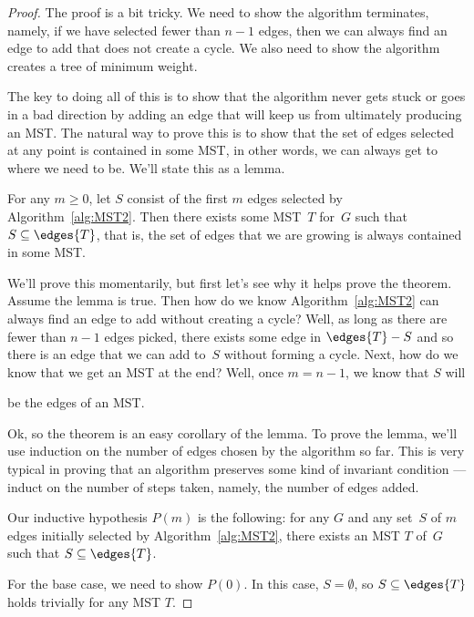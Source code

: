 \begin{proof}
The proof is a bit tricky.  We need to show the algorithm terminates,
namely, if we have selected fewer than $n - 1$ edges, then we can
always find an edge to add that does not create a cycle.  We also need
to show the algorithm creates a tree of minimum weight.

The key to doing all of this is to show that the algorithm never gets
stuck or goes in a bad direction by adding an edge that will keep us
from ultimately producing an MST\@.  The natural way to prove this is
to show that the set of edges selected at any point is contained in
some MST, in other words, we can always get to where we need to be.
We'll state this as a lemma.

\begin{lemma}\label{lemma:MST2}
  For any $m \ge 0$, let $S$ consist of the first $m$ edges selected by
  Algorithm~\ref{alg:MST2}.  Then there exists some MST~$T$ for~$G$ such
  that $S \subseteq \edges{T}$, that is, the set of edges that we are
  growing is always contained in some MST\@.
\end{lemma}

We'll prove this momentarily, but first let's see why it helps prove
the theorem.  Assume the lemma is true.  Then how do we know
Algorithm~\ref{alg:MST2} can always find an edge to add without
creating a cycle?  Well, as long as there are fewer than $n - 1$ edges
picked, there exists some edge in $\edges{T} - S$ and so there is an
edge that we can add to~$S$ without forming a cycle.  Next, how do we
know that we get an MST at the end?  Well, once $m = n - 1$, we know
that $S$ will
\begin{editingnotes}
\end{editingnotes}
be the edges of an MST.

Ok, so the theorem is an easy corollary of the lemma.  To prove the
lemma, we'll use induction on the number of edges chosen by the
algorithm so far.  This is very typical in proving that an algorithm
preserves some kind of invariant condition ---induct on the number of
steps taken, namely, the number of edges added.

Our inductive hypothesis $P(m)$ is the following: for any $G$ and any
set~$S$ of $m$ edges initially selected by Algorithm~\ref{alg:MST2},
there exists an MST $T$ of~$G$ such that $S \subseteq \edges{T}$.

For the base case, we need to show $P(0)$.  In this case, $S =
\emptyset$, so $S \subseteq \edges{T}$ holds trivially for any MST
$T$.


\end{proof}

